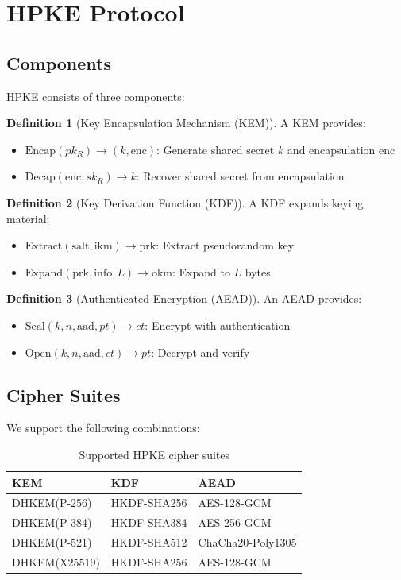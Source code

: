 \documentclass[11pt,a4paper]{article}
\theoremstyle{definition}
\newtheorem{definition}{Definition}
\begin{document}
\section{HPKE Protocol}

\subsection{Components}

HPKE consists of three components:

\begin{definition}[Key Encapsulation Mechanism (KEM)]
A KEM provides:
\begin{itemize}
\item $\text{Encap}(pk_R) \to (k, \text{enc})$: Generate shared secret $k$ and encapsulation $\text{enc}$
\item $\text{Decap}(\text{enc}, sk_R) \to k$: Recover shared secret from encapsulation
\end{itemize}
\end{definition}

\begin{definition}[Key Derivation Function (KDF)]
A KDF expands keying material:
\begin{itemize}
\item $\text{Extract}(\text{salt}, \text{ikm}) \to \text{prk}$: Extract pseudorandom key
\item $\text{Expand}(\text{prk}, \text{info}, L) \to \text{okm}$: Expand to $L$ bytes
\end{itemize}
\end{definition}

\begin{definition}[Authenticated Encryption (AEAD)]
An AEAD provides:
\begin{itemize}
\item $\text{Seal}(k, n, \text{aad}, pt) \to ct$: Encrypt with authentication
\item $\text{Open}(k, n, \text{aad}, ct) \to pt$: Decrypt and verify
\end{itemize}
\end{definition}

\subsection{Cipher Suites}

We support the following combinations:

\begin{table}[h]
\centering
\begin{tabular}{lll}
\toprule
KEM & KDF & AEAD \\
\midrule
DHKEM(P-256) & HKDF-SHA256 & AES-128-GCM \\
DHKEM(P-384) & HKDF-SHA384 & AES-256-GCM \\
DHKEM(P-521) & HKDF-SHA512 & ChaCha20-Poly1305 \\
DHKEM(X25519) & HKDF-SHA256 & AES-128-GCM \\
\bottomrule
\end{tabular}
\caption{Supported HPKE cipher suites}
\end{table}
\end{document}
